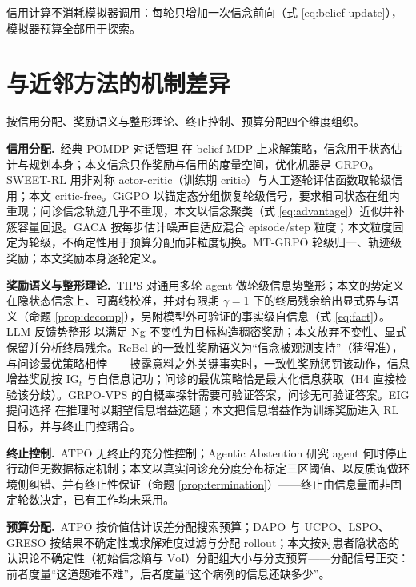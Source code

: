 \documentclass[11pt,a4paper]{ctexart}
\newcommand{\1}[1]{\mathbb{1}\!\left[#1\right]}
\newcommand{\IG}{\mathrm{IG}}
\newcommand{\VoI}{\mathrm{VoI}}
\begin{document}
信用计算不消耗模拟器调用：每轮只增加一次信念前向（式 \eqref{eq:belief-update}），模拟器预算全部用于探索。

\section{与近邻方法的机制差异}
按信用分配、奖励语义与整形理论、终止控制、预算分配四个维度组织。

\textbf{信用分配.}\ 经典 POMDP 对话管理 \cite{young2013pomdp} 在 belief-MDP 上求解策略，信念用于状态估计与规划本身；本文信念只作奖励与信用的度量空间，优化机器是 GRPO。SWEET-RL \cite{pan2025sweetrl} 用非对称 actor-critic（训练期 critic）与人工逐轮评估函数取轮级信用；本文 critic-free。GiGPO \cite{feng2025gigpo} 以锚定态分组恢复轮级信号，要求相同状态在组内重现；问诊信念轨迹几乎不重现，本文以信念聚类（式 \eqref{eq:advantage}）近似并补簇容量回退。GACA \cite{liang2026gaca} 按每步估计噪声自适应混合 episode/step 粒度；本文粒度固定为轮级，不确定性用于预算分配而非粒度切换。MT-GRPO \cite{zeng2025mtgrpo} 轮级归一、轨迹级奖励；本文奖励本身逐轮定义。

\textbf{奖励语义与整形理论.}\ TIPS \cite{tips2026} 对通用多轮 agent 做轮级信息势整形；本文的势定义在隐状态信念上、可离线校准，并对有限期 $\gamma=1$ 下的终局残余给出显式界与语义（命题 \ref{prop:decomp}），另附模型外可验证的事实级自信息（式 \eqref{eq:fact}）。LLM 反馈势整形 \cite{pibrfs2026} 以满足 Ng 不变性为目标构造稠密奖励；本文放弃不变性、显式保留并分析终局残余。ReBel \cite{tang2026rebel} 的一致性奖励语义为``信念被观测支持''（猜得准），与问诊最优策略相悖——披露意料之外关键事实时，一致性奖励惩罚该动作，信息增益奖励按 $\IG_t$ 与自信息记功；问诊的最优策略恰是最大化信息获取（H4 直接检验该分歧）。GRPO-VPS \cite{grpovps2026} 的自概率探针需要可验证答案，问诊无可验证答案。EIG 提问选择 \cite{mazzaccara2024learning} 在推理时以期望信息增益选题；本文把信息增益作为训练奖励进入 RL 目标，并与终止门控耦合。

\textbf{终止控制.}\ ATPO \cite{cao2026atpo} 无终止的充分性控制；Agentic Abstention \cite{abstention2026} 研究 agent 何时停止行动但无数据标定机制；本文以真实问诊充分度分布标定三区阈值、以反质询做环境侧纠错、并有终止性保证（命题 \ref{prop:termination}）——终止由信息量而非固定轮数决定，已有工作均未采用。

\textbf{预算分配.}\ ATPO \cite{cao2026atpo} 按价值估计误差分配搜索预算；DAPO \cite{yu2025dapo} 与 UCPO、LSPO、GRESO 按结果不确定性或求解难度过滤与分配 rollout；本文按对患者隐状态的认识论不确定性（初始信念熵与 $\VoI$）分配组大小与分支预算——分配信号正交：前者度量``这道题难不难''，后者度量``这个病例的信息还缺多少''。
\end{document}

